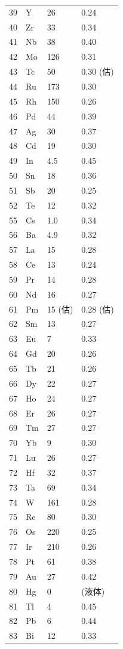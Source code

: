 \documentclass[12pt,a4paper]{article}
\begin{document}
\begin{longtable}{p{0.6cm}p{1.2cm}p{1.5cm}p{1.5cm}}
		39 & Y  & 26 & 0.24 \\
		40 & Zr & 33 & 0.34 \\
		41 & Nb & 38 & 0.40 \\
		42 & Mo & 126 & 0.31 \\
		43 & Tc & 50 & 0.30 (估) \\
		44 & Ru & 173 & 0.30 \\
		45 & Rh & 150 & 0.26 \\
		46 & Pd & 44 & 0.39 \\
		47 & Ag & 30 & 0.37 \\
		48 & Cd & 19 & 0.30 \\
		49 & In & 4.5 & 0.45 \\
		50 & Sn & 18 & 0.36 \\
		51 & Sb & 20 & 0.25 \\
		52 & Te & 12 & 0.32 \\
		55 & Cs & 1.0 & 0.34 \\
		56 & Ba & 4.9 & 0.32 \\
		57 & La & 15 & 0.28 \\
		58 & Ce & 13 & 0.24 \\
		59 & Pr & 14 & 0.28 \\
		60 & Nd & 16 & 0.27 \\
		61 & Pm & 15 (估) & 0.28 (估) \\
		62 & Sm & 13 & 0.27 \\
		63 & Eu & 7 & 0.33 \\
		64 & Gd & 20 & 0.26 \\
		65 & Tb & 21 & 0.26 \\
		66 & Dy & 22 & 0.27 \\
		67 & Ho & 24 & 0.27 \\
		68 & Er & 26 & 0.27 \\
		69 & Tm & 27 & 0.27 \\
		70 & Yb & 9 & 0.30 \\
		71 & Lu & 26 & 0.27 \\
		72 & Hf & 32 & 0.37 \\
		73 & Ta & 69 & 0.34 \\
		74 & W  & 161 & 0.28 \\
		75 & Re & 80 & 0.30 \\
		76 & Os & 220 & 0.25 \\
		77 & Ir & 210 & 0.26 \\
		78 & Pt & 61 & 0.38 \\
		79 & Au & 27 & 0.42 \\
		80 & Hg & 0 & (液体) \\
		81 & Tl & 4 & 0.45 \\
		82 & Pb & 6 & 0.44 \\
		83 & Bi & 12 & 0.33 \\
		\bottomrule
	\end{longtable}
	
\end{document}
